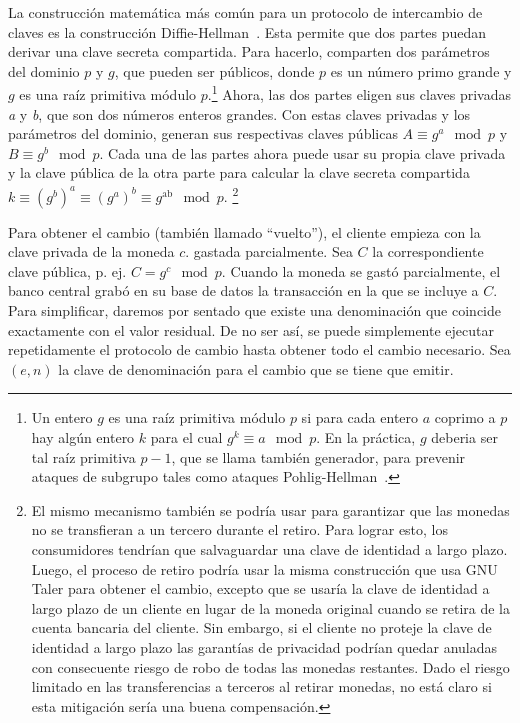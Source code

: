 \documentclass[10pt,spanish]{article}
\begin{document}
La construcción matemática más común para un protocolo de intercambio de
claves es la construcción Diffie-Hellman~\cite{Diffie}. Esta
permite que dos partes puedan derivar una clave secreta compartida. Para
hacerlo, comparten dos parámetros del dominio $p$ y $g$, que
pueden ser públicos, donde $p$ es un número primo grande y $g$
es una raíz primitiva módulo $p$.\footnote{Un entero $g$ es una raíz
primitiva módulo $p$ si para cada entero $a$ coprimo a $p$ hay
algún entero $k$ para el cual
$g^k \equiv a \mod p$.
En la práctica, $g$ deberia ser tal raíz primitiva $p-1$, que se
llama también generador, para prevenir ataques de subgrupo tales como ataques
Pohlig-Hellman~\cite[véase][]{Lim}.} Ahora, las dos partes eligen sus claves
privadas \emph{a} y \emph{b}, que son dos números enteros grandes. Con estas claves
privadas y los parámetros del dominio, generan sus respectivas claves
públicas $A \equiv g^{a} \mod p$ y $B \equiv g^{b} \mod p$.
Cada una de las partes ahora puede usar su propia clave privada y la
clave pública de la otra parte para calcular la clave secreta compartida
$k \equiv \left( g^b \right)^{a} \equiv \left( g^{a} \right)^{b} \equiv g^{\text{ab}} \mod p$.
\footnote{El mismo mecanismo también se podría usar para garantizar que
las monedas no se transfieran a un tercero durante el retiro. Para
lograr esto, los consumidores tendrían que salvaguardar una clave de
identidad a largo plazo. Luego, el proceso de retiro podría usar la
misma construcción que usa GNU Taler para obtener el cambio, excepto
que se usaría la clave de identidad a largo plazo de un cliente en
lugar de la moneda original cuando se retira de la cuenta bancaria del
cliente. Sin embargo, si el cliente no proteje la clave de identidad a
largo plazo las garantías de privacidad podrían quedar anuladas con
consecuente riesgo de robo de todas las monedas restantes. Dado el
riesgo limitado en las transferencias a terceros al retirar monedas,
no está claro si esta mitigación sería una buena compensación.}

Para obtener el cambio (también llamado ``vuelto''), el cliente empieza
con la clave privada de la moneda $c$. gastada parcialmente. Sea $C$ la
correspondiente clave pública, p. ej.
$C = g^{c} \mod p$.
Cuando la moneda se gastó parcialmente, el banco central grabó en su base de
datos la transacción en la que se incluye a $C$. Para simplificar, daremos
por sentado que existe una denominación que coincide exactamente con el
valor residual. De no ser así, se puede simplemente ejecutar
repetidamente el protocolo de cambio hasta obtener todo el cambio
necesario. Sea $(e,n)$ la clave de denominación para el
cambio que se tiene que emitir.
\end{document}
